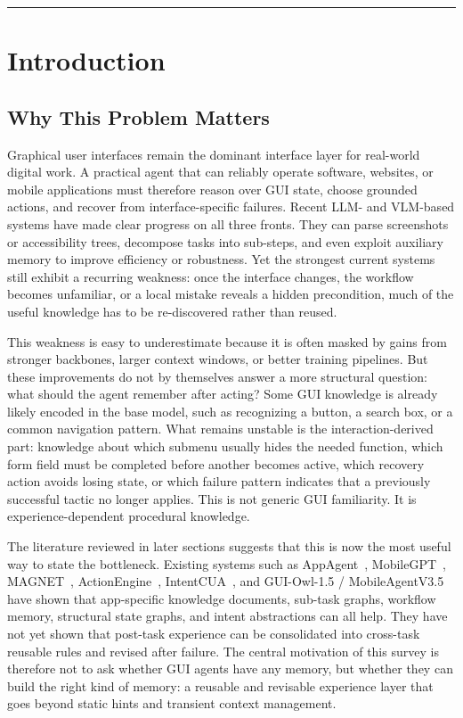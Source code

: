 \documentclass{article}
\begin{document}
\begin{center}\rule{0.5\linewidth}{0.5pt}\end{center}

\section{Introduction}\label{2-introduction}

\subsection{Why This Problem
Matters}\label{21-why-this-problem-matters}

Graphical user interfaces remain the dominant interface layer for
real-world digital work. A practical agent that can reliably operate
software, websites, or mobile applications must therefore reason over
GUI state, choose grounded actions, and recover from interface-specific
failures. Recent LLM- and VLM-based systems have made clear progress on
all three fronts. They can parse screenshots or accessibility trees,
decompose tasks into sub-steps, and even exploit auxiliary memory to
improve efficiency or robustness. Yet the strongest current systems
still exhibit a recurring weakness: once the interface changes, the
workflow becomes unfamiliar, or a local mistake reveals a hidden
precondition, much of the useful knowledge has to be re-discovered
rather than reused.

This weakness is easy to underestimate because it is often masked by
gains from stronger backbones, larger context windows, or better
training pipelines. But these improvements do not by themselves answer a
more structural question: what should the agent remember after acting?
Some GUI knowledge is already likely encoded in the base model, such as
recognizing a button, a search box, or a common navigation pattern. What
remains unstable is the interaction-derived part: knowledge about which
submenu usually hides the needed function, which form field must be
completed before another becomes active, which recovery action avoids
losing state, or which failure pattern indicates that a previously
successful tactic no longer applies. This is not generic GUI
familiarity. It is experience-dependent procedural knowledge.

The literature reviewed in later sections suggests that this is now the
most useful way to state the bottleneck. Existing systems such as
AppAgent~\parencite{zhang2023appagent},
MobileGPT~\parencite{lee2024mobilegpt},
MAGNET~\parencite{sun2026magnet},
ActionEngine~\parencite{zhong2026actionengine},
IntentCUA~\parencite{lee2026intentcua}, and GUI-Owl-1.5 /
MobileAgentV3.5~\parencite{xu2026mobileagentv35} have shown that
app-specific knowledge documents, sub-task graphs, workflow memory,
structural state graphs, and intent abstractions can all help. They
have not yet shown that post-task experience can be consolidated into
cross-task reusable rules and revised after failure. The central
motivation of this survey is therefore not to ask whether GUI agents
have any memory, but whether they can build the right kind of memory: a
reusable and revisable experience layer that goes beyond static hints
and transient context management.
\end{document}
